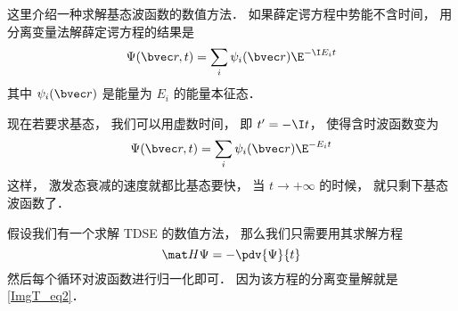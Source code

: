 
\begin{issues}
\issueDraft
\end{issues}

这里介绍一种求解基态波函数的数值方法． 如果薛定谔方程中势能不含时间， 用分离变量法解薛定谔方程的结果是
\begin{equation}
\Psi(\bvec r, t) = \sum_i \psi_i(\bvec r) \E^{-\I E_i t}
\end{equation}
其中 $\psi_i(\bvec r)$ 是能量为 $E_i$ 的能量本征态．

现在若要求基态， 我们可以用虚数时间， 即 $t' = -\I t$， 使得含时波函数变为
\begin{equation}\label{ImgT_eq2}
\Psi(\bvec r, t) = \sum_i \psi_i(\bvec r) \E^{- E_i t}
\end{equation}
这样， 激发态衰减的速度就都比基态要快， 当 $t \to +\infty$ 的时候， 就只剩下基态波函数了．

假设我们有一个求解 TDSE 的数值方法， 那么我们只需要用其求解方程
\begin{equation}
\mat H\Psi = -\pdv{\Psi}{t}
\end{equation}
然后每个循环对波函数进行归一化即可． 因为该方程的分离变量解就是\autoref{ImgT_eq2}．
